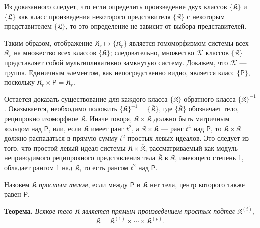 \documentclass[11pt]{article}
\begin{document}
Из доказанного следует, что если определить произведение двух классов \(\{\mathfrak K\}\) и \(\{\mathfrak L\}\) как класс произведения некоторого представителя \(\{\mathfrak K\}\) с некоторым представителем \(\{\mathfrak L\}\), то это определение не зависит от выбора представителей.

Таким образом, отображение \(\mathfrak K_r\mapsto\{\mathfrak K_r\}\) является гомоморфизмом системы всех \(\mathfrak K_r\) на множество всех классов \(\{\mathfrak K\}\); следовательно, множество \(\mathscr K\) классов \(\{\mathfrak K\}\) представляет собой мультипликативно замкнутую систему. Докажем, что \(\mathscr K\) --- группа. Единичным элементом, как непосредственно видно, является класс \(\{\mathsf P\}\), поскольку \(\mathfrak K_r\times\mathsf P=\mathfrak K_r\).

Остается доказать существование для каждого класса \(\{\mathfrak K\}\) обратного класса \(\{\mathfrak K\}^{-1}\). Оказывается, необходимо положить \(\{\mathfrak K\}^{-1}=\{\overline{\mathfrak K}\}\), где \(\{\overline{\mathfrak K}\}\) обозначает тело, реципрокно изоморфное \(\mathfrak K\). Иначе говоря, \(\mathfrak K\times\overline{\mathfrak K}\) должно быть матричным кольцом над \(\mathsf P\), или, если \(\mathfrak K\) имеет ранг \(t^2\), а \(\mathfrak K\times\overline{\mathfrak K}\) --- ранг \(t^4\) над \(\mathsf P\), то \(\mathfrak K\times\overline{\mathfrak K}\) должно распадаться в прямую сумму \(t^2\) простых левых идеалов. Это следует из того, что простой левый идеал системы \(\mathfrak K\times\overline{\mathfrak K}\), рассматриваемый как модуль неприводимого реципрокного представления тела \(\overline{\mathfrak K}\) в \(\mathfrak K\), имеющего степень 1, обладает рангом 1 над \(\mathfrak K\), то есть рангом \(t^2\) над \(\mathsf P\).

Назовем \(\mathfrak K\) \emph{простым телом}, если между \(\mathsf P\) и \(\mathfrak K\) нет тела, центр которого также равен \(\mathsf P\).

\textbf{Теорема.} \emph{Всякое тело \(\mathfrak K\) является прямым произведением простых подтел \(\mathfrak K^{(i)}\),}
\[
\mathfrak K=\mathfrak K^{(1)}\times\cdots\times\mathfrak K^{(p)}.
\]
\end{document}
